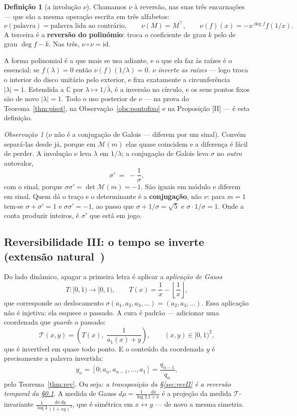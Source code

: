 \documentclass[11pt,a4paper]{article}
\theoremstyle{plain}
\theoremstyle{definition}
\newtheorem{definicao}[teorema]{Definição}
\theoremstyle{remark}
\newtheorem{obs}[teorema]{Observação}
\newcommand{\C}{\mathbb{C}}
\newcommand{\Mat}[1]{\mathcal{M}(#1)}
\newcommand{\cf}[2]{[#1;#2]}
\begin{document}
\begin{definicao}[a involução $\nu$]\label{def:nu}
Chamamos $\nu$ à reversão, nas suas três encarnações --- que são a mesma operação escrita em três
alfabetos:
\[
  \nu(\text{palavra}) = \text{palavra lida ao contrário},\qquad
  \nu(M) = M^{\!\top},\qquad
  \nu(f)(x) = -x^{\deg f} f(1/x) .
\]
A terceira é a \textbf{reversão do polinómio}: troca o coeficiente de grau $k$ pelo de grau
$\deg f - k$. Nas três, $\nu\circ\nu = \mathrm{id}$.
\end{definicao}

\noindent A forma polinomial é a que mais se usa adiante, e o que ela faz às raízes é o essencial:
se $f(\lambda) = 0$ então $\nu(f)(1/\lambda) = 0$. \emph{$\nu$ inverte as raízes} --- logo troca o
interior do disco unitário pelo exterior, e fixa exatamente a circunferência $|\lambda| = 1$.
Estendida a $\C$ por $\lambda\mapsto1/\bar\lambda$, é a inversão no círculo, e os seus pontos fixos
são de novo $|\lambda|=1$. Todo o uso posterior de $\nu$ --- na prova do Teorema~\ref{thm:pisot},
na Observação~\ref{obs:pontofixo} e na Proposição [II] --- é esta definição.

\begin{obs}[$\nu$ não é a conjugação de Galois --- diferem por um sinal]\label{obs:nugalois}
Convém separá-las desde já, porque em $\Mat{m}$ elas quase coincidem e a diferença é fácil de
perder. A involução $\nu$ leva $\lambda$ em $1/\lambda$; a conjugação de Galois leva $\sigma$ no
\emph{outro} autovalor,
\[
  \sigma' \;=\; -\frac{1}{\sigma} ,
\]
com o sinal, porque $\sigma\sigma' = \det\Mat{m} = -1$. São iguais em módulo e diferem em sinal.
Quem dá o traço e o determinante é a \textbf{conjugação}, não $\nu$: para $m=1$ tem-se
$\sigma+\sigma' = 1$ e $\sigma\sigma' = -1$, ao passo que $\sigma + 1/\sigma = \sqrt5$ e
$\sigma\cdot 1/\sigma = 1$. Onde a conta produzir inteiros, é $\sigma'$ que está em jogo.
\end{obs}

\subsection{Reversibilidade III: o tempo se inverte (extensão natural~\cite{nakada1981})}\label{sec:revIII}

Do lado dinâmico, apagar a primeira letra é aplicar a \emph{aplicação de Gauss}
\[
  T:[0,1)\to[0,1), \qquad T(x) = \frac{1}{x} - \left\lfloor \frac{1}{x}\right\rfloor,
\]
que corresponde ao deslocamento $\sigma(a_1,a_2,a_3,\dots) = (a_2,a_3,\dots)$. Essa aplicação
não é injetiva: ela esquece o passado. A cura é padrão --- adicionar uma coordenada que
\emph{guarde} o passado:
\[
  \mathcal{T}(x,y) = \left( T(x),\; \frac{1}{a_1(x)+y}\right), \qquad (x,y)\in[0,1)^2,
\]
que é invertível em quase todo ponto. E o conteúdo da coordenada $y$ é precisamente a palavra
invertida:
\[
  y_n = \cf{0}{a_n,a_{n-1},\dots,a_1} = \frac{q_{n-1}}{q_n},
\]
pelo Teorema~\ref{thm:rev}. Ou seja: \emph{a transposição da \S\ref{sec:revII} é a reversão
temporal da \S\ref{sec:revIII}}. A medida de Gauss $d\mu = \frac{1}{\log 2}\frac{dx}{1+x}$ é a projeção da medida
$\mathcal{T}$-invariante $\frac{1}{\log 2}\frac{dx\,dy}{(1+xy)^2}$, que é simétrica em $x
\leftrightarrow y$ --- de novo a mesma simetria.
\end{document}
